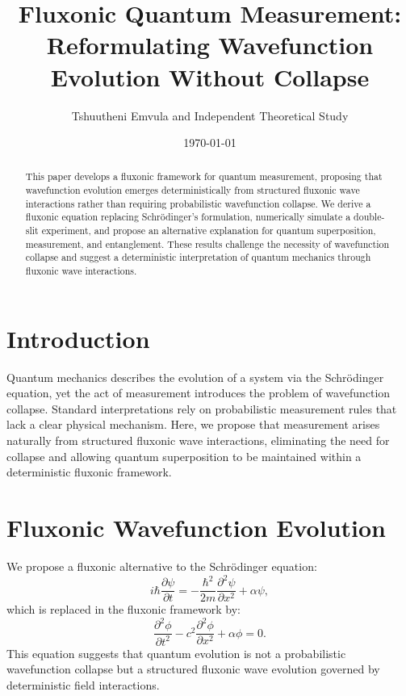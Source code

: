 \documentclass{article}
\title{Fluxonic Quantum Measurement: Reformulating Wavefunction Evolution Without Collapse}
\author{Tshuutheni Emvula and Independent Theoretical Study}
\date{\today}
\begin{document}
\maketitle

\begin{abstract}
This paper develops a fluxonic framework for quantum measurement, proposing that wavefunction evolution emerges deterministically from structured fluxonic wave interactions rather than requiring probabilistic wavefunction collapse. We derive a fluxonic equation replacing Schrödinger’s formulation, numerically simulate a double-slit experiment, and propose an alternative explanation for quantum superposition, measurement, and entanglement. These results challenge the necessity of wavefunction collapse and suggest a deterministic interpretation of quantum mechanics through fluxonic wave interactions.
\end{abstract}

\section{Introduction}
Quantum mechanics describes the evolution of a system via the Schrödinger equation, yet the act of measurement introduces the problem of wavefunction collapse. Standard interpretations rely on probabilistic measurement rules that lack a clear physical mechanism. Here, we propose that measurement arises naturally from structured fluxonic wave interactions, eliminating the need for collapse and allowing quantum superposition to be maintained within a deterministic fluxonic framework.

\section{Fluxonic Wavefunction Evolution}
We propose a fluxonic alternative to the Schrödinger equation:
\begin{equation}
    i\hbar \frac{\partial \psi}{\partial t} = -\frac{\hbar^2}{2m} \frac{\partial^2 \psi}{\partial x^2} + \alpha \psi,
\end{equation}
which is replaced in the fluxonic framework by:
\begin{equation}
    \frac{\partial^2 \phi}{\partial t^2} - c^2 \frac{\partial^2 \phi}{\partial x^2} + \alpha \phi = 0.
\end{equation}
This equation suggests that quantum evolution is not a probabilistic wavefunction collapse but a structured fluxonic wave evolution governed by deterministic field interactions.
\end{document}
